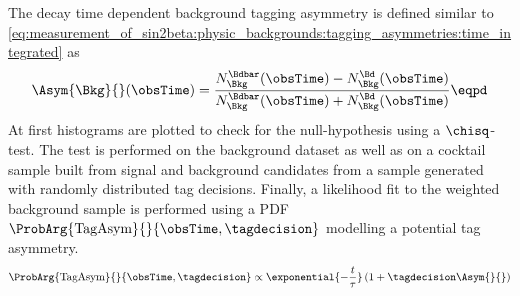 The decay time dependent background tagging asymmetry is defined similar to 
\cref{eq:measurement_of_sin2beta:physic_backgrounds:tagging_asymmetries:time_integrated} as
%
\begin{equation}\label{eq:measurement_of_sin2beta:physic_backgrounds:tagging_asymmetries:time_dependent}
  \Asym{\Bkg}{}(\obsTime) = \frac{N_{\Bkg}^{\Bdbar}(\obsTime) - N_{\Bkg}^{\Bd}(\obsTime)}{N_{\Bkg}^{\Bdbar}(\obsTime) + N_{\Bkg}^{\Bd}(\obsTime)}\eqpd
\end{equation}
%
At first histograms are plotted to check for the null-hypothesis using a
$\chisq$-test. The test is performed on the background \sweighted dataset as
well as on a cocktail \MC sample built from signal \MC and background candidates
from a \ToyMC sample generated with randomly distributed tag decisions. Finally,
a likelihood fit to the weighted background sample is performed using a \ac{PDF}
$\ProbArg{\text{TagAsym}}{}{\obsTime, \tagdecision}$ modelling a potential tag asymmetry.
%
\begin{equation}\label{eq:measurement_of_sin2beta:physic_backgrounds:tagging_asymmetries:time_dependent:pdf}
  \ProbArg{\text{TagAsym}}{}{\obsTime, \tagdecision} \propto \exponential{- \frac{t}{\tau}} \left( 1 + \tagdecision \Asym{}{} \right)
\end{equation}

